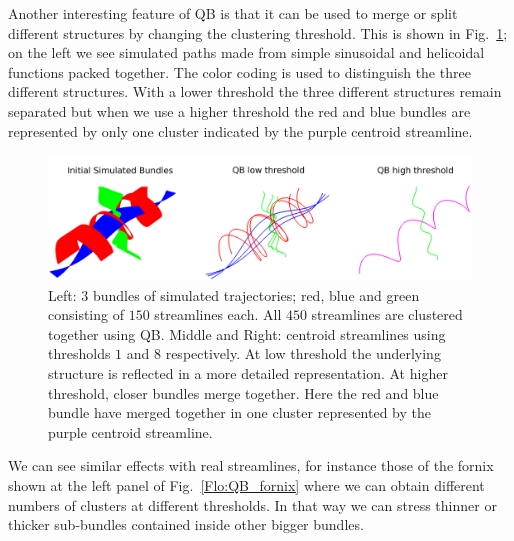 \documentclass{bioinfo}
\begin{document}
\begin{methods}
Another interesting feature of QB is that it can be used to merge or
split different structures by changing the clustering threshold.  This is
shown in Fig.~\ref{Flo:simulated_orbits}; on the left we see simulated
paths made from simple sinusoidal and helicoidal functions packed
together. The color coding is used to distinguish the three different
structures. With a lower threshold the three different structures remain
separated but when we use a higher threshold the red and blue bundles
are represented by only one cluster indicated by the purple centroid
streamline.

\begin{figure}
\begin{centering}
\includegraphics[width=160mm]{Figures/Fig_5_helix_phantom}
\par\end{centering}
\caption{Left: $3$ bundles of simulated trajectories; red, blue and
  green consisting of $150$ streamlines each. All $450$ streamlines are
  clustered together using QB. Middle and Right: centroid streamlines
  using thresholds $1$ and $8$ respectively.  At low threshold the
  underlying structure is reflected in a more detailed
  representation. At higher threshold, closer bundles merge
  together. Here the red and blue bundle have merged together in one
  cluster represented by the purple centroid
  streamline.\label{Flo:simulated_orbits}}
\end{figure}

We can see similar effects with real streamlines, for instance those of
the fornix shown at the left panel of Fig.~\ref{Flo:QB_fornix} where we
can obtain different numbers of clusters at different thresholds. In
that way we can stress thinner or thicker sub-bundles contained inside
other bigger bundles.


\end{methods}
\end{document}
